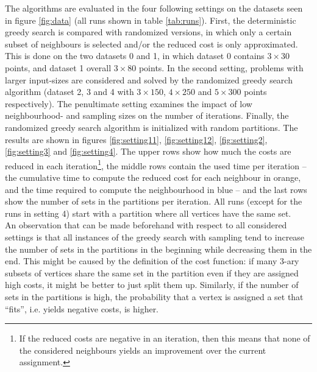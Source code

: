 The algorithms are evaluated in the four following settings on the datasets seen in figure \ref{fig:data} (all runs shown in table \ref{tab:runs}). First, the deterministic greedy search is compared with randomized versions, in which only a certain subset of neighbours is selected and/or the reduced cost is only approximated. This is done on the two datasets 0 and 1, in which dataset 0 contains $3 \times 30$ points, and dataset 1 overall $3 \times 80$ points. In the second setting, problems with larger input-sizes are considered and solved by the randomized greedy search algorithm (dataset 2, 3 and 4 with $3 \times 150$, $4 \times 250$ and $5 \times 300$ points respectively). The penultimate setting examines the impact of low neighbourhood- and sampling sizes on the number of iterations. Finally, the randomized greedy search algorithm is initialized with random partitions. The results are shown in figures \ref{fig:setting11}, \ref{fig:setting12}, \ref{fig:setting2}, \ref{fig:setting3} and \ref{fig:setting4}. The upper rows show how much the costs are reduced in each iteration\footnote{If the reduced costs are negative in an iteration, then this means that none of the considered neighbours yields an improvement over the current assignment.}, the middle rows contain the used time per iteration -- the cumulative time to compute the reduced cost for each neighbour in orange, and the time required to compute the neighbourhood in blue -- and the last rows show the number of sets in the partitions per iteration. All runs (except for the runs in setting 4) start with a partition where all vertices have the same set. 
\\
An observation that can be made beforehand with respect to all considered settings is that all instances of the greedy search with sampling tend to increase the number of sets in the partitions in the beginning while decreasing them in the end. This might be caused by the definition of the cost function: if many 3-ary subsets of vertices share the same set in the partition even if they are assigned high costs, it might be better to just split them up. Similarly, if the number of sets in the partitions is high, the probability that a vertex is assigned a set that ``fits'', i.e. yields negative costs, is higher.


